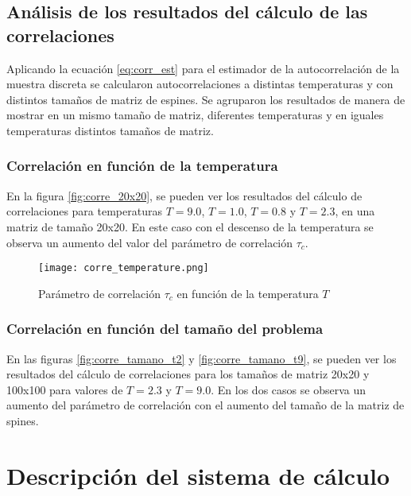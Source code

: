 \subsection{Análisis de los resultados del cálculo de las correlaciones}

Aplicando la ecuación  \ref{eq:corr_est}  para el estimador de la autocorrelación de la muestra discreta
se calcularon autocorrelaciones a distintas temperaturas y con distintos tamaños 
de matriz de espines. Se agruparon los resultados de manera de mostrar en un mismo
tamaño de matriz, diferentes temperaturas y en iguales temperaturas distintos tamaños de matriz.

\subsubsection{Correlación en función de la temperatura}

En la figura \ref{fig:corre_20x20}, se pueden ver los resultados del cálculo
de correlaciones para  temperaturas $T =9.0 $, $T = 1.0 $, $T =0.8 $ y $T = 2.3 $, en una matriz de tamaño 20x20.
En este caso con el descenso de la temperatura se observa un aumento del valor del parámetro
de correlación $\tau_{c}$.


\begin{figure}[H]
   \begin{center}
        \texttt{[image: corre\_temperature.png]} \\
        \caption{Parámetro de correlación  $\tau_{c}$ en función de la temperatura $T$}\label{fig:corre_tempe}
    \end{center}
\end{figure}


\subsubsection{Correlación en función del tamaño del problema}
En las figuras \ref{fig:corre_tamano_t2} y \ref{fig:corre_tamano_t9}, se pueden ver los resultados del cálculo
de correlaciones para los tamaños de matriz 20x20 y 100x100 para valores de $T = 2.3$  y $T = 9.0$. 
En los dos casos se observa un aumento del parámetro de correlación con el aumento del 
tamaño de la matriz de spines.

\section{Descripci\'on del sistema de c\'alculo}


